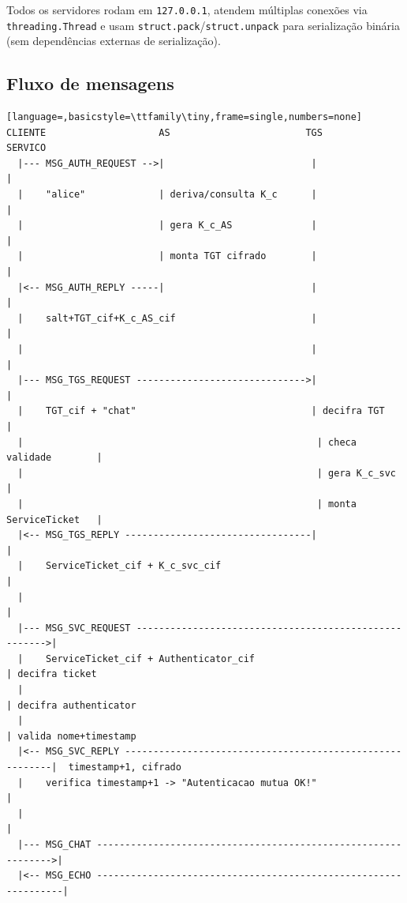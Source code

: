 \documentclass[11pt,a4paper]{article}
\begin{document}
Todos os servidores rodam em \texttt{127.0.0.1}, atendem múltiplas conexões via
\texttt{threading.Thread} e usam \texttt{struct.pack}/\texttt{struct.unpack} para
serialização binária (sem dependências externas de serialização).

\subsection{Fluxo de mensagens}

\begin{lstlisting}[language=,basicstyle=\ttfamily\tiny,frame=single,numbers=none]
CLIENTE                    AS                        TGS                    SERVICO
  |--- MSG_AUTH_REQUEST -->|                          |                       |
  |    "alice"             | deriva/consulta K_c      |                       |
  |                        | gera K_c_AS              |                       |
  |                        | monta TGT cifrado        |                       |
  |<-- MSG_AUTH_REPLY -----|                          |                       |
  |    salt+TGT_cif+K_c_AS_cif                        |                       |
  |                                                   |                       |
  |--- MSG_TGS_REQUEST ------------------------------>|                       |
  |    TGT_cif + "chat"                               | decifra TGT           |
  |                                                    | checa validade        |
  |                                                    | gera K_c_svc          |
  |                                                    | monta ServiceTicket   |
  |<-- MSG_TGS_REPLY ---------------------------------|                       |
  |    ServiceTicket_cif + K_c_svc_cif                                        |
  |                                                                           |
  |--- MSG_SVC_REQUEST ------------------------------------------------------>|
  |    ServiceTicket_cif + Authenticator_cif                                  | decifra ticket
  |                                                                           | decifra authenticator
  |                                                                           | valida nome+timestamp
  |<-- MSG_SVC_REPLY ---------------------------------------------------------|  timestamp+1, cifrado
  |    verifica timestamp+1 -> "Autenticacao mutua OK!"                       |
  |                                                                           |
  |--- MSG_CHAT -------------------------------------------------------------->|
  |<-- MSG_ECHO ----------------------------------------------------------------|
\end{lstlisting}
\end{document}

